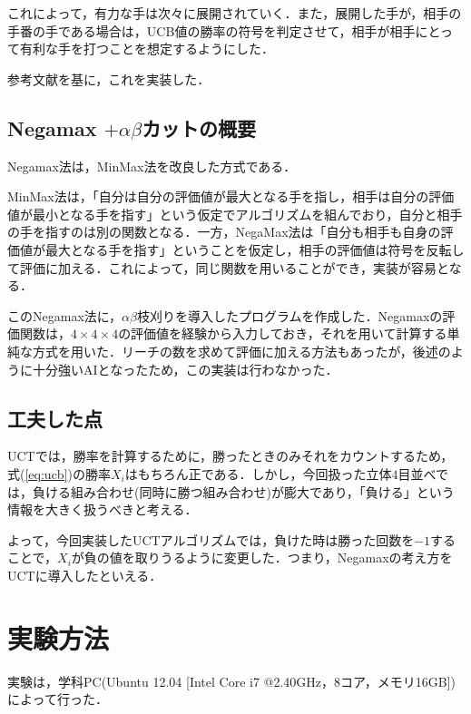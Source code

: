 \documentclass{jarticle}
\begin{document}
これによって，有力な手は次々に展開されていく．また，展開した手が，相手の手番の手である場合は，UCB値の勝率の符号を判定させて，相手が相手にとって有利な手を打つことを想定するようにした．

参考文献\cite{ref:book}を基に，これを実装した．

\subsection{Negamax $+ \alpha \beta$カットの概要\cite{ref:book}\cite{ref:negamax}}
Negamax法は，MinMax法を改良した方式である．

MinMax法は，「自分は自分の評価値が最大となる手を指し，相手は自分の評価値が最小となる手を指す」という仮定でアルゴリズムを組んでおり，自分と相手の手を指すのは別の関数となる．一方，NegaMax法は「自分も相手も自身の評価値が最大となる手を指す」ということを仮定し，相手の評価値は符号を反転して評価に加える．これによって，同じ関数を用いることができ，実装が容易となる．

このNegamax法に，$\alpha \beta$枝刈りを導入したプログラムを作成した．Negamaxの評価関数は，$4 \times 4 \times 4$の評価値を経験から入力しておき，それを用いて計算する単純な方式を用いた．リーチの数を求めて評価に加える方法もあったが，後述のように十分強いAIとなったため，この実装は行わなかった．



\subsection{工夫した点}
UCTでは，勝率を計算するために，勝ったときのみそれをカウントするため，式(\ref{eq:ucb})の勝率$X_i$はもちろん正である．しかし，今回扱った立体$4$目並べでは，負ける組み合わせ(同時に勝つ組み合わせ)が膨大であり，「負ける」という情報を大きく扱うべきと考える．

よって，今回実装したUCTアルゴリズムでは，負けた時は勝った回数を$-1$することで，$X_i$が負の値を取りうるように変更した．つまり，Negamaxの考え方をUCTに導入したといえる．



\section{実験方法}
実験は，学科PC(Ubuntu 12.04 [Intel Core i7 @2.40GHz，8コア，メモリ16GB])によって行った．
\end{document}
